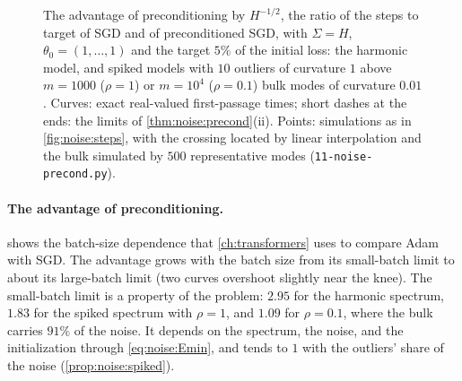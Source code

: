 \begin{refsection}
\begin{figure}[t]
\centering
{}
\caption{The advantage of preconditioning by $H^{-1/2}$, the ratio of the steps to target of SGD and of preconditioned SGD, with $\Sigma=H$, $\theta_0=(1,\dots,1)$ and the target $5\%$ of the initial loss: the harmonic model, and spiked models with $10$ outliers of curvature $1$ above $m=1000$ ($\rho=1$) or $m=10^4$ ($\rho=0.1$) bulk modes of curvature $0.01$. Curves: exact real-valued first-passage times; short dashes at the ends: the limits of \cref{thm:noise:precond}(ii). Points: simulations as in \cref{fig:noise:steps}, with the crossing located by linear interpolation and the bulk simulated by $500$ representative modes (\texttt{11-noise-precond.py}).}
\label{fig:noise:precond}
\end{figure}

\paragraph{The advantage of preconditioning.}  shows the batch-size dependence that \cref{ch:transformers} uses to compare Adam with SGD. The advantage grows with the batch size from its small-batch limit to about its large-batch limit (two curves overshoot slightly near the knee). The small-batch limit is a property of the problem: $2.95$ for the harmonic spectrum, $1.83$ for the spiked spectrum with $\rho=1$, and $1.09$ for $\rho=0.1$, where the bulk carries $91\%$ of the noise. It depends on the spectrum, the noise, and the initialization through \eqref{eq:noise:Emin}, and tends to $1$ with the outliers' share of the noise (\cref{prop:noise:spiked}).


\end{refsection}
